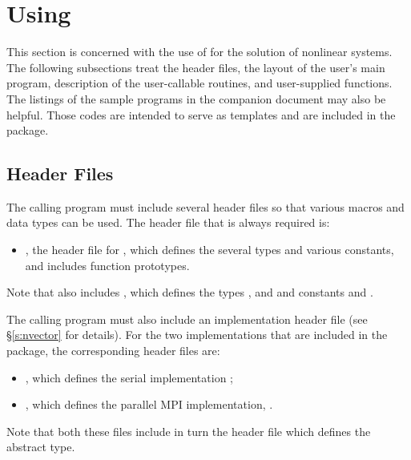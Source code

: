 \chapter{Using {\kinsol}}\label{c:usage}

This section is concerned with the use of {\kinsol} for the solution of nonlinear systems.
The following subsections treat the header files, the layout of the user's main
program, description of the {\kinsol} user-callable routines, and user-supplied functions.
The listings of the sample programs in the companion document \cite{kin2.2.0_ex} may also 
be helpful. Those codes are intended to serve as templates and are included in the 
{\kinsol} package.

\section{Header Files}\label{s:headers_sol}

The calling program must include several header files so that various macros
and data types can be used. The header file that is always required is:
%
\begin{itemize}
\item  {}, 
  the header file for {\kinsol}, which defines the several
  types and various constants, and includes function prototypes.
\end{itemize}
%
Note that  also includes , 
which defines the types , and 
and constants  and .

The calling program must also include an {\nvector} implementation header file
(see \S\ref{s:nvector} for details).
For the two {\nvector} implementations that are included in the {\kinsol} package,
the corresponding header files are:
%
\begin{itemize}
\item {}, 
  which defines the serial implementation {\nvecs};
\item {}, 
  which defines the parallel MPI implementation, {\nvecp}.
\end{itemize}
%
Note that both these files include in turn the header file  which 
defines the abstract  type. 


